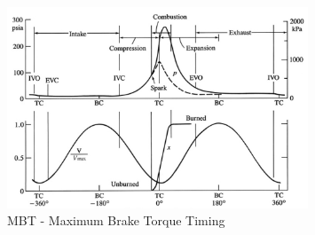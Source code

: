 \documentclass{article}
\begin{document}
\begin{figure}
    \centering
    \includegraphics[width=0.8\textwidth]{img/mbt.jpeg}
    \caption{MBT - Maximum Brake Torque Timing}
    \label{fig:mbt_timing}
\end{figure}
\end{document}
